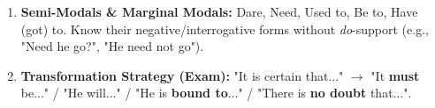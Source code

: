 \documentclass[11pt]{article}
\newcommand{\cle}[1]{{\popxbold\color{popdark}#1}}
\begin{document}
\begin{methode}
\begin{enumerate}
\begin{itemize}
        \item \cle{May} = Formal permission (Granting). \cle{Can} = Informal permission / Ability. \cle{Could} = Polite request / Past permission.
    \end{itemize}
    \item \textbf{Semi-Modals \& Marginal Modals:} \cle{Dare, Need, Used to, Be to, Have (got) to}. Know their negative/interrogative forms without \textit{do}-support (e.g., "Need he go?", "He need not go").
    \item \textbf{Transformation Strategy (Exam):} "It is certain that..." $\rightarrow$ "It \textbf{must} be..." / "He will..." / "He is \textbf{bound to}..." / "There is \textbf{no doubt} that...".
\end{enumerate}
\end{methode}
\end{document}

